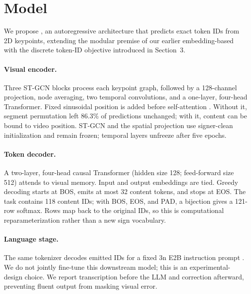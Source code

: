 \section{Model}

We propose \ImitatorEOne{}, an autoregressive architecture that predicts exact
\Gemma{} token IDs from 2D keypoints, extending the modular premise of our
earlier embedding-based \system{} \citep{velasquez2026imitator} with the
discrete token-ID objective introduced in Section~3.

\paragraph{Visual encoder.}
Three ST-GCN blocks process each keypoint graph, followed by a 128-channel
projection, node averaging, two temporal convolutions, and a one-layer, four-head
Transformer.  Fixed sinusoidal position is added before self-attention
\citep{vaswani2017attention}.  Without it, segment permutation left 86.3\% of
predictions unchanged; with it, content can be bound to video position.  ST-GCN
and the spatial projection use signer-clean initialization and remain frozen;
temporal layers unfreeze after five epochs.

\paragraph{Token decoder.}
A two-layer, four-head causal Transformer (hidden size 128; feed-forward size 512)
attends to visual memory.  Input and output embeddings are tied.  Greedy decoding
starts at BOS, emits at most 32 content tokens, and stops at EOS.  The task contains
118 \Gemma{} content IDs; with BOS, EOS, and PAD, a bijection gives a 121-row
softmax.  Rows map back to the original IDs, so this is computational
reparameterization rather than a new sign vocabulary.

\paragraph{Language stage.}
The same tokenizer decodes emitted IDs for a fixed \Gemma{} 3n E2B instruction
prompt \citep{gemma3n}.  We do not jointly fine-tune this downstream model; this
is an experimental-design choice.  We report transcription before the LLM and
correction afterward, preventing fluent output from masking visual error.

